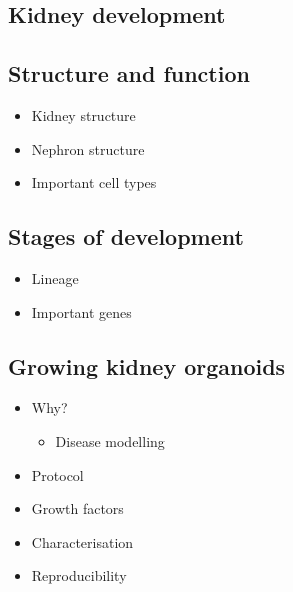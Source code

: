 \documentclass[11pt,a4paper,titlepage,twoside,openright]{style/unimelbthesis}
\theoremstyle{definition}
\theoremstyle{definition}
\theoremstyle{definition}
\theoremstyle{remark}
\begin{document}
\begin{mainmatter}
\hypertarget{kidney-development}{%
\section{Kidney development}\label{kidney-development}}

\hypertarget{structure-and-function}{%
\subsection{Structure and function}\label{structure-and-function}}

\begin{itemize}
\tightlist
\item
  Kidney structure
\item
  Nephron structure
\item
  Important cell types
\end{itemize}

\hypertarget{stages-of-development}{%
\subsection{Stages of development}\label{stages-of-development}}

\begin{itemize}
\tightlist
\item
  Lineage
\item
  Important genes
\end{itemize}

\hypertarget{growing-kidney-organoids}{%
\subsection{Growing kidney organoids}\label{growing-kidney-organoids}}

\begin{itemize}
\tightlist
\item
  Why?

  \begin{itemize}
  \tightlist
  \item
    Disease modelling
  \end{itemize}
\item
  Protocol
\item
  Growth factors
\item
  Characterisation
\item
  Reproducibility
\end{itemize}

\hypertarget{the-scrna-seq-tools-landscape}{%
}
\end{mainmatter}
\end{document}
